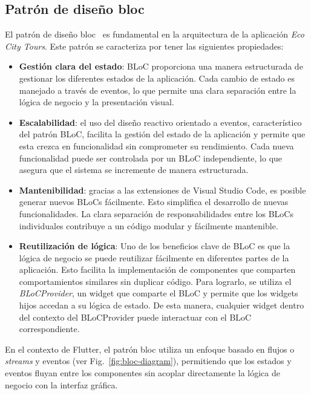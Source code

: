 \subsection{Patrón de diseño \acrfull{bloc}}
El patrón de diseño \acrshort{bloc}~\cite{flutter_bloc} es fundamental en la arquitectura de la aplicación \textit{Eco City Tours}. Este patrón se caracteriza por tener las siguientes propiedades:
\begin{itemize}
	
	\item \textbf{Gestión clara del estado}: BLoC proporciona una manera estructurada de gestionar los diferentes estados de la aplicación. Cada cambio de estado es manejado a través de eventos, lo que permite una clara separación entre la lógica de negocio y la presentación visual.
	
	\item \textbf{Escalabilidad}: el uso del diseño reactivo orientado a eventos, característico del patrón BLoC, facilita la gestión del estado de la aplicación y permite que esta crezca en funcionalidad sin comprometer su rendimiento. Cada nueva funcionalidad puede ser controlada por un BLoC independiente, lo que asegura que el sistema se incremente de manera estructurada.
	
	\item \textbf{Mantenibilidad}: gracias a las extensiones de Visual Studio Code, es posible generar nuevos BLoCs fácilmente. Esto simplifica el desarrollo de nuevas funcionalidades. La clara separación de responsabilidades entre los BLoCs individuales contribuye a un código modular y fácilmente mantenible.
	
	\item \textbf{Reutilización de lógica}: Uno de los beneficios clave de BLoC es que la lógica de negocio se puede reutilizar fácilmente en diferentes partes de la aplicación. Esto facilita la implementación de componentes que comparten comportamientos similares sin duplicar código. Para lograrlo, se utiliza el \textit{BLoCProvider}, un widget que comparte el BLoC y permite que los widgets hijos accedan a su lógica de estado. De esta manera, cualquier widget dentro del contexto del BLoCProvider puede interactuar con el BLoC correspondiente.
	
\end{itemize}

En el contexto de Flutter, el patrón \acrlong{bloc} utiliza un enfoque basado en flujos o \textit{streams} y eventos (ver Fig.~\ref{fig:bloc-diagram}), permitiendo que los estados y eventos fluyan entre los componentes sin acoplar directamente la lógica de negocio con la interfaz gráfica. 

